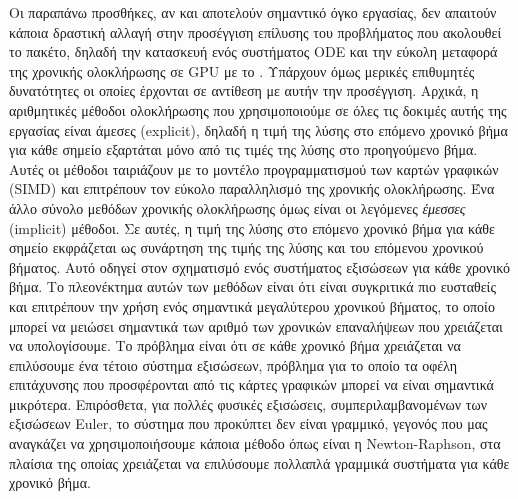 Οι παραπάνω προσθήκες, αν και αποτελούν σημαντικό όγκο εργασίας, δεν απαιτούν κάποια δραστική αλλαγή στην προσέγγιση επίλυσης του προβλήματος που ακολουθεί το πακέτο, δηλαδή την κατασκευή ενός συστήματος ODE και την εύκολη μεταφορά της χρονικής ολοκλήρωσης σε GPU με το .
Υπάρχουν όμως μερικές επιθυμητές δυνατότητες οι οποίες έρχονται σε αντίθεση με αυτήν την προσέγγιση.
Αρχικά, η αριθμητικές μέθοδοι ολοκλήρωσης που χρησιμοποιούμε σε όλες τις δοκιμές αυτής της εργασίας είναι άμεσες (explicit), δηλαδή η τιμή της λύσης στο επόμενο χρονικό βήμα για κάθε σημείο εξαρτάται μόνο από τις τιμές της λύσης στο προηγούμενο βήμα.
Αυτές οι μέθοδοι ταιριάζουν με το μοντέλο προγραμματισμού των καρτών γραφικών (SIMD) και επιτρέπουν τον εύκολο παραλληλισμό της χρονικής ολοκλήρωσης.
Ένα άλλο σύνολο μεθόδων χρονικής ολοκλήρωσης όμως είναι οι λεγόμενες \emph{έμεσσες} (implicit) μέθοδοι.
Σε αυτές, η τιμή της λύσης στο επόμενο χρονικό βήμα για κάθε σημείο εκφράζεται ως συνάρτηση της τιμής της λύσης και του επόμενου χρονικού βήματος.
Αυτό οδηγεί στον σχηματισμό ενός συστήματος εξισώσεων για κάθε χρονικό βήμα.
Το πλεονέκτημα αυτών των μεθόδων είναι ότι είναι συγκριτικά πιο ευσταθείς και επιτρέπουν την χρήση ενός σημαντικά μεγαλύτερου χρονικού βήματος, το οποίο μπορεί να μειώσει σημαντικά των αριθμό των χρονικών επαναλήψεων που χρειάζεται να υπολογίσουμε.
Το πρόβλημα είναι ότι σε κάθε χρονικό βήμα χρειάζεται να επιλύσουμε ένα τέτοιο σύστημα εξισώσεων, πρόβλημα για το οποίο τα οφέλη επιτάχυνσης που προσφέρονται από τις κάρτες γραφικών μπορεί να είναι σημαντικά μικρότερα.
Επιρόσθετα, για πολλές φυσικές εξισώσεις, συμπεριλαμβανομένων των εξισώσεων Euler, το σύστημα που προκύπτει δεν είναι γραμμικό, γεγονός που μας αναγκάζει να χρησιμοποιήσουμε κάποια μέθοδο όπως είναι η Newton-Raphson, στα πλαίσια της οποίας χρειάζεται να επιλύσουμε πολλαπλά γραμμικά συστήματα για κάθε χρονικό βήμα.

